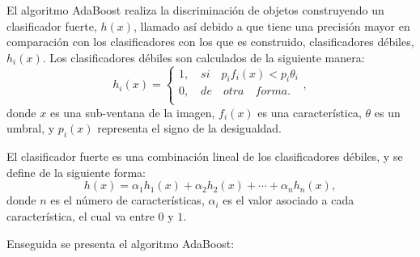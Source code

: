 El algoritmo AdaBoost realiza la discriminación de objetos construyendo un clasificador fuerte, $h(x)$, llamado así debido a que tiene una precisión mayor en comparación con los clasificadores con los que es construido, clasificadores débiles, $h_i(x)$. Los clasificadores débiles son calculados de la siguiente manera: 
\begin{equation}
h_i(x)=
\begin{cases}   
1, \quad si \quad  p_if_i(x)<p_i \theta_i \\
0, \quad de \quad otra \quad forma.\\
\end{cases} ,
\end{equation}
donde $x$ es una sub-ventana de la imagen, $f_i(x)$ es una característica, $\theta$ es un umbral, y $p_i(x)$ representa el signo de la desigualdad.   

El clasificador fuerte es una combinación lineal de los clasificadores débiles, y se define de la siguiente forma: 
\begin{equation}
h(x)= \alpha_1h_1(x)+\alpha_2h_2(x)+ \cdots +\alpha_nh_n(x) ,
\end{equation}
donde $n$ es el n\'umero de características, $\alpha_i$ es el valor asociado a cada característica, el cual va entre $0$ y $1$.

Enseguida se presenta el algoritmo AdaBoost:

